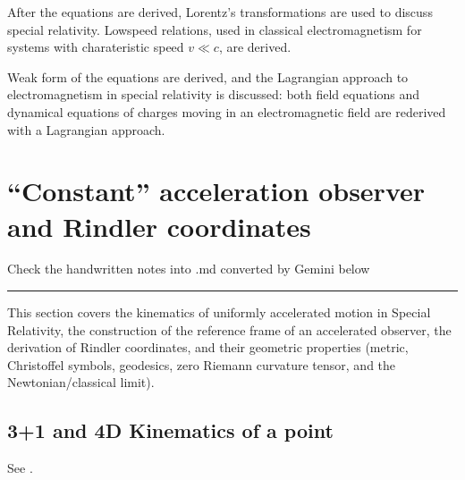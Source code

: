 \documentclass[letterpaper,10pt,english]{jupyterBook}
\begin{document}
\sphinxAtStartPar
{} After the equations are derived, Lorentz’s transformations are used to discuss special relativity. Low\sphinxhyphen{}speed relations, used in classical electromagnetism for systems with charateristic speed \(v \ll c\), are derived.

\sphinxAtStartPar
{} Weak form of the equations are derived, and the Lagrangian approach to electromagnetism in special relativity is discussed: both field equations and dynamical equations of charges moving in an electromagnetic field are re\sphinxhyphen{}derived with a Lagrangian approach.

\sphinxstepscope


\chapter{“Constant” acceleration observer and Rindler coordinates}
\label{\detokenize{ch/relativity-special/rindler:constant-acceleration-observer-and-rindler-coordinates}}\label{\detokenize{ch/relativity-special/rindler:relativity-special-rindler}}\label{\detokenize{ch/relativity-special/rindler::doc}}
\sphinxAtStartPar
{} Check the hand\sphinxhyphen{}written notes into .md converted by Gemini below


\bigskip\hrule\bigskip


\sphinxAtStartPar
This section covers the kinematics of uniformly accelerated motion in Special Relativity, the construction of the reference frame of an accelerated observer, the derivation of Rindler coordinates, and their geometric properties (metric, Christoffel symbols, geodesics, zero Riemann curvature tensor, and the Newtonian/classical limit).


\section{3+1 and 4D Kinematics of a point}
\label{\detokenize{ch/relativity-special/rindler:and-4d-kinematics-of-a-point}}\label{\detokenize{ch/relativity-special/rindler:relativity-special-rindler-kinematics-point}}
\sphinxAtStartPar
See {\hyperref[\detokenize{ch/relativity-special/notes:relativity-special-notes-kinematics-point}]{}}.
\end{document}
